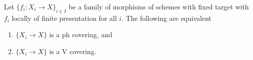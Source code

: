%
\begin{lemma}
\label{lemma-equivalence-h-v-locally-finite-presentation}
Let $\{f_i : X_i \to X\}_{i \in I}$ be a family of morphisms
of schemes with fixed target with $f_i$ locally of finite
presentation for all $i$. The following are equivalent
\begin{enumerate}
\item $\{X_i \to X\}$ is a ph covering, and
\item $\{X_i \to X\}$ is a V covering.
\end{enumerate}
\end{lemma}


